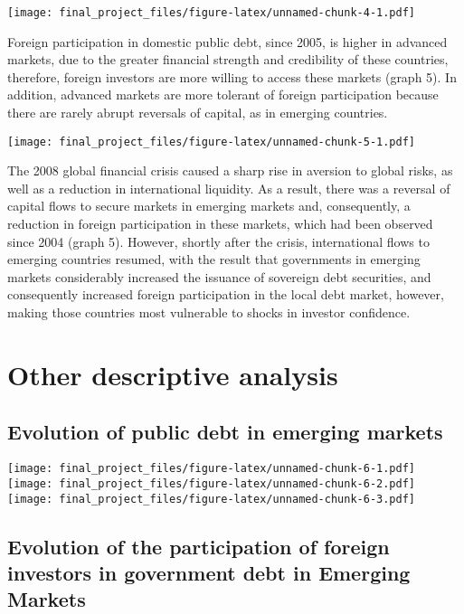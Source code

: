 \documentclass[
]{article}
\begin{document}
\texttt{[image: final\_project\_files/figure-latex/unnamed-chunk-4-1.pdf]}

Foreign participation in domestic public debt, since 2005, is higher in
advanced markets, due to the greater financial strength and credibility
of these countries, therefore, foreign investors are more willing to
access these markets (graph 5). In addition, advanced markets are more
tolerant of foreign participation because there are rarely abrupt
reversals of capital, as in emerging countries.

\texttt{[image: final\_project\_files/figure-latex/unnamed-chunk-5-1.pdf]}

The 2008 global financial crisis caused a sharp rise in aversion to
global risks, as well as a reduction in international liquidity. As a
result, there was a reversal of capital flows to secure markets in
emerging markets and, consequently, a reduction in foreign participation
in these markets, which had been observed since 2004 (graph 5). However,
shortly after the crisis, international flows to emerging countries
resumed, with the result that governments in emerging markets
considerably increased the issuance of sovereign debt securities, and
consequently increased foreign participation in the local debt market,
however, making those countries most vulnerable to shocks in investor
confidence.

\hypertarget{other-descriptive-analysis}{%
\section{Other descriptive analysis}\label{other-descriptive-analysis}}

\hypertarget{evolution-of-public-debt-in-emerging-markets}{%
\subsection{Evolution of public debt in emerging
markets}\label{evolution-of-public-debt-in-emerging-markets}}

\texttt{[image: final\_project\_files/figure-latex/unnamed-chunk-6-1.pdf]}
\texttt{[image: final\_project\_files/figure-latex/unnamed-chunk-6-2.pdf]}
\texttt{[image: final\_project\_files/figure-latex/unnamed-chunk-6-3.pdf]}

\hypertarget{evolution-of-the-participation-of-foreign-investors-in-government-debt-in-emerging-markets}{%
\subsection{Evolution of the participation of foreign investors in
government debt in Emerging
Markets}\label{evolution-of-the-participation-of-foreign-investors-in-government-debt-in-emerging-markets}}
\end{document}
